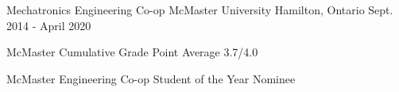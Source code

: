 
\begin{cventries}

  \cventry
    {Mechatronics Engineering Co-op} %
    {McMaster University} %
    {Hamilton, Ontario} %
    {Sept. 2014 - April 2020} %
    {
      \begin{cvitems} %
        \item {McMaster Cumulative Grade Point Average 3.7/4.0}
        \item {McMaster Engineering Co-op Student of the Year Nominee}
      \end{cvitems}
    }


\end{cventries}
